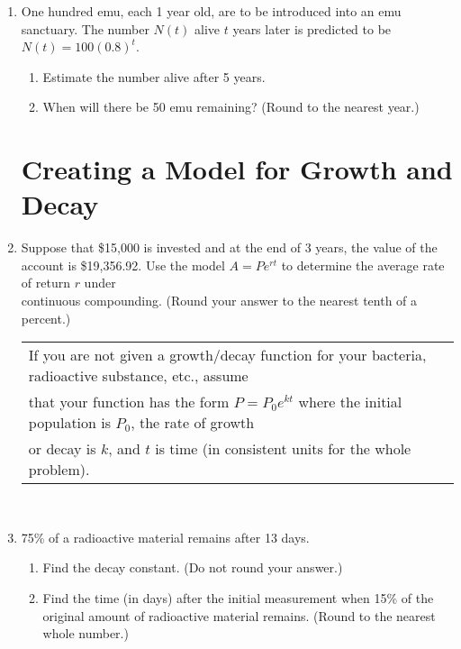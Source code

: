 \documentclass[11pt]{article}
\begin{document}
\begin{enumerate}
\item One hundred emu, each 1 year old, are to be introduced into an emu sanctuary.  The number $N(t)$ alive $t$ years later is predicted to be $N(t)=100(0.8)^t$.
\begin{enumerate}
\item Estimate the number alive after 5 years.\\[.3in]
\item When will there be 50 emu remaining? (Round to the nearest year.)\\[1in]
\end{enumerate}


\section{Creating a Model for Growth and Decay}
\item Suppose that \$15,000 is invested and at the end of 3 years, the value of the account is \$19,356.92.  Use the model $A=Pe^{rt}$ to determine the average rate of return $r$ under \\continuous compounding. (Round your answer to the nearest tenth of a percent.)

\newpage

\noindent \begin{tabular}{| l |} \hline
If you are not given a growth/decay function for your bacteria, radioactive substance, etc., assume\\ that your function has the form $P=P_0e^{kt}$ where the initial population is $P_0$, the rate of growth \\or decay is $k$, and $t$ is time (in consistent units for the whole problem).\\ \hline
\end{tabular} \\

\item 75\% of a radioactive material remains after 13 days. 
\begin{enumerate}
\item Find the decay constant. (Do not round your answer.)\\[1.5in]
\item Find the time (in days) after the initial measurement when 15\% of the original amount of radioactive material remains. (Round to the nearest whole number.) \\[2.5in]
\end{enumerate}



\end{enumerate}
\end{document}
